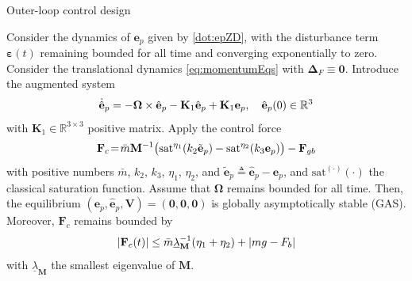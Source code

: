 \documentclass{beamer}
\begin{document}
\begin{frame}{Outer-loop control design}
	
	Consider the dynamics of $\mathbf{e}_p$ given by \eqref{dot:epZD}, with the disturbance term $\boldsymbol{\varepsilon}(t)$ remaining bounded for all time and converging exponentially to zero. Consider the translational dynamics \eqref{eq:momentumEqs} with $\mathbf{\Delta}_F \equiv \mathbf{0}$.
	Introduce the augmented system \vspace{-0.1cm}
	\begin{equation}\label{dot:ephatZD}
	\dot {\hat{\mathbf{e}}}_p = -\mathbf{\Omega}\times  \hat{\mathbf{e}}_p   -\mathbf{K}_1 \hat{\mathbf{e}}_p + \mathbf{K}_1 {\mathbf{e}}_p, \quad  \hat{\mathbf{e}}_p(0) \in \mathbb{R}^3\vspace{-0.1cm}
	\end{equation}
	with $\mathbf{K}_1\in \mathbb{R}^{3\times 3}$ positive matrix. Apply the control force \vspace{-0.1cm}
	\begin{equation}\label{u:force}
	\mathbf{F}_c \!=\! \bar m \mathbf{M}^{-1} \big(\mathrm{sat}^{\eta_1}(k_2 \tilde{\mathbf{e}}_p)  - \mathrm{sat}^{\eta_2}( k_3 {\mathbf{e}}_p) \big) - \mathbf{F}_{gb} \vspace{-0.1cm}
	\end{equation}
	with positive numbers $\bar m$, $k_2$, $k_3$, $\eta_1$, $\eta_2$, and $\tilde {\mathbf{e}}_p \triangleq \hat{\mathbf{e}}_p - \mathbf{e}_p$, and $\mathrm{sat}^{(\cdot)}(\cdot)$ the classical saturation function.
	Assume that $\mathbf{\Omega}$ remains bounded for all time. Then, the equilibrium $(\mathbf{e}_p,{\hat{\mathbf{e}}}_p, \mathbf{V})=(\mathbf{0},\mathbf{0},\mathbf{0})$ is globally asymptotically stable (GAS). Moreover, $\mathbf{F}_c$ remains bounded by \vspace{-0.1cm}
	\begin{equation}\label{bound:force}
	|\mathbf{F}_c(t)| \leq \bar{m} \underline{\lambda}_{\mathbf{M}}^{-1}(\eta_1 + \eta_2) + |mg - F_b| \vspace{-0.1cm}
	\end{equation}
	with $\underline{\lambda}_{\mathbf{M}}$ the smallest eigenvalue of $\mathbf{M}$.	

\end{frame}
\end{document}

